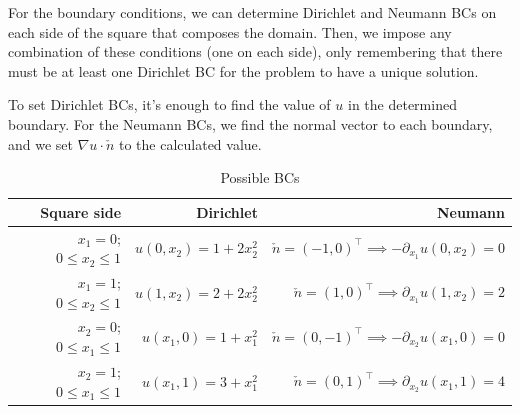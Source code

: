 \documentclass[12pt]{article}
\begin{document}
    For the boundary conditions, we can determine Dirichlet and Neumann BCs on each side of the square that composes the domain. Then, we impose any combination of these conditions (one on each side), only remembering that there must be at least one Dirichlet BC for the problem to have a unique solution.

    To set Dirichlet BCs, it's enough to find the value of $u$ in the determined boundary. For the Neumann BCs, we find the normal vector to each boundary, and we set $\nabla u \cdot \check{n}$ to the calculated value.

    \begin{table}[H]
        \centering
        \renewcommand{\arraystretch}{1.5}
        \begin{tabular}{r|r|r}
             Square side & Dirichlet & Neumann  \\
             \hline
             \hline
             $x_1 = 0$; $0\le x_2 \le 1$ & $u(0,x_2) = 1 + 2x_2^2$ & $\check{n} = (-1,0)^\top \implies -\partial_{x_1}u(0,x_2) = 0$\\
             \hline
             $x_1 = 1$; $0\le x_2 \le 1$ & $u(1,x_2) = 2 + 2x_2^2$ & $\check{n} = (1,0)^\top \implies \partial_{x_1}u(1,x_2) = 2$\\
             \hline
             $x_2 = 0$; $0\le x_1 \le 1$ & $u(x_1,0) = 1 +  x_1^2$ & $\check{n} = (0,-1)^\top \implies -\partial_{x_2}u(x_1,0) = 0$\\
             \hline
             $x_2 = 1$; $0\le x_1 \le 1$ & $u(x_1,1) = 3 +  x_1^2$ & $\check{n} = (0,1)^\top \implies \partial_{x_2}u(x_1,1) = 4$\\
        \end{tabular}
        \caption{Possible BCs}
        \label{tab:placeholder}
    \end{table}
\end{document}
